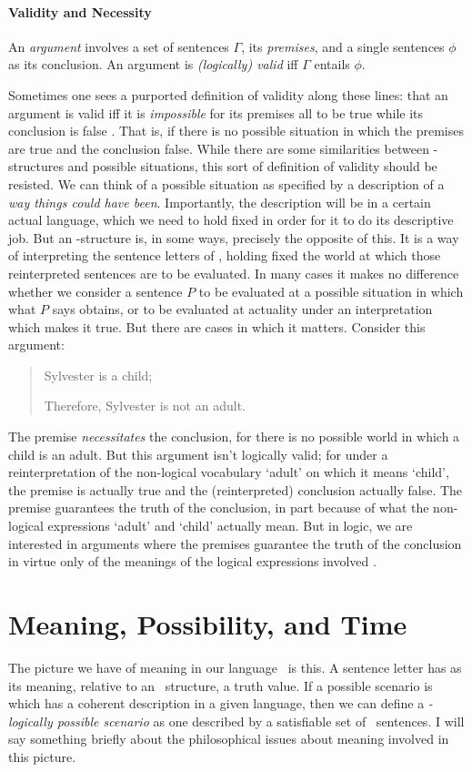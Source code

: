 \paragraph{Validity and Necessity}An \emph{argument} involves a set of sentences $\Gamma$, its \emph{premises}, and a single sentences $\phi$ as its conclusion. An argument is \emph{(logically) valid} iff  $\Gamma$  entails $\phi$. 

 Sometimes one sees a purported definition of validity along these lines: that an argument is valid iff it is \emph{impossible} for its premises all to be true while its conclusion is false \citep[19]{sweetreas}. That is, if there is no possible situation in which the premises are true and the conclusion false. While there are some similarities between \lone-structures and possible situations, this sort of definition of validity should be resisted. We can think of a possible situation as specified by a description of a \emph{way things could have been}. Importantly, the description will be in a certain actual language, which we need to hold fixed in order for it to do its descriptive job. But an \lone-structure is, in some ways, precisely the opposite of this. It is a way of interpreting the sentence letters of \lone, holding fixed the world at which those reinterpreted sentences are to be evaluated. In many cases it makes no difference whether we consider a sentence $P$ to be evaluated at a possible situation in which what $P$ says obtains, or to be evaluated at actuality under an interpretation which makes it true. But there are cases in which it matters. Consider this argument: \begin{quotation}
	Sylvester is a child;

	Therefore, Sylvester is not an adult.
\end{quotation}
The premise \emph{necessitates} the conclusion, for there is no possible world in which a child is an adult. But this argument isn't logically valid; for under a reinterpretation of the non-logical vocabulary ‘adult’ on which it means ‘child’, the premise is actually true and the (reinterpreted) conclusion actually false. The premise guarantees the truth of the conclusion, in part because of what the non-logical expressions ‘adult’ and ‘child’ actually mean. But in logic, we are interested in arguments where the premises guarantee the truth of the conclusion in virtue only of the meanings of the logical expressions involved \citep{tarski}.

\section{Meaning, Possibility, and Time} The picture we have of meaning in our language \lone\ is this. A sentence letter has as its meaning, relative to an \lone\ structure, a truth value. If a possible scenario is which has a coherent description in a given language, then we can define a \emph{\lone-logically possible scenario} as one described by a satisfiable set of \lone\ sentences. I will say something briefly about the philosophical issues about meaning involved in this picture.


